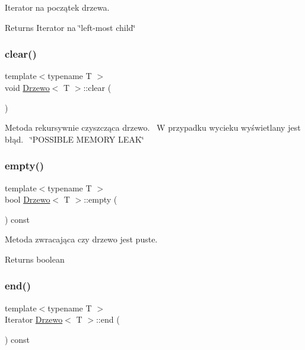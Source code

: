 Iterator na początek drzewa. \begin{DoxyReturn}{Returns}
Iterator na \char`\"{}left-\/most child\char`\"{} 
\end{DoxyReturn}
\mbox{\label{class_drzewo_ab40006bf25bf232befcd4643a8c527cf}} 
\subsubsection{\texorpdfstring{clear()}{clear()}}
{\footnotesize\ttfamily template$<$typename T $>$ \\
void \hyperlink{class_drzewo}{Drzewo}$<$ T $>$\+::clear (\begin{DoxyParamCaption}{ }\end{DoxyParamCaption})\hspace{0.3cm}{\ttfamily [inline]}}

Metoda rekursywnie czyszcząca drzewo.~\newline
W przypadku wycieku wyświetlany jest błąd.~\newline
\char`\"{}\+P\+O\+S\+S\+I\+B\+L\+E M\+E\+M\+O\+R\+Y L\+E\+A\+K\char`\"{} \mbox{\label{class_drzewo_af02b0705726b31926a1a3e0b8bbef233}} 
\subsubsection{\texorpdfstring{empty()}{empty()}}
{\footnotesize\ttfamily template$<$typename T $>$ \\
bool \hyperlink{class_drzewo}{Drzewo}$<$ T $>$\+::empty (\begin{DoxyParamCaption}{ }\end{DoxyParamCaption}) const\hspace{0.3cm}{\ttfamily [inline]}}

Metoda zwracająca czy drzewo jest puste. \begin{DoxyReturn}{Returns}
boolean 
\end{DoxyReturn}
\mbox{\label{class_drzewo_a4d594d3e08d1c4e21223c106baef0013}} 
\subsubsection{\texorpdfstring{end()}{end()}}
{\footnotesize\ttfamily template$<$typename T $>$ \\
Iterator \hyperlink{class_drzewo}{Drzewo}$<$ T $>$\+::end (\begin{DoxyParamCaption}{ }\end{DoxyParamCaption}) const\hspace{0.3cm}{\ttfamily [inline]}}

